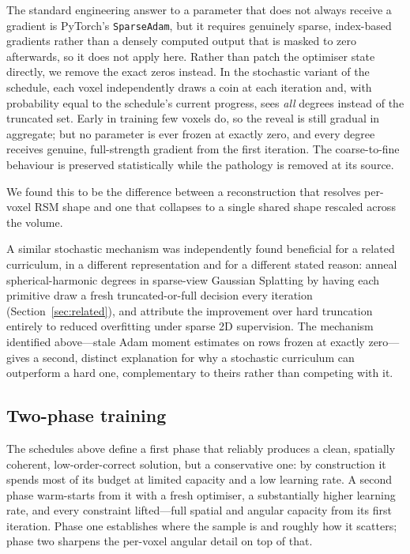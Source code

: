 \documentclass[11pt,a4paper]{article}
\begin{document}
The standard engineering answer to a parameter that does not always receive a gradient is
PyTorch's \texttt{SparseAdam}, but it requires genuinely sparse, index-based gradients
rather than a densely computed output that is masked to zero afterwards, so it does not
apply here. Rather than patch the optimiser state directly, we remove the exact zeros
instead. In the stochastic variant of the schedule, each voxel independently draws a coin
at each iteration and, with probability equal to the schedule's current progress, sees
\emph{all} degrees instead of the truncated set. Early in training few voxels do, so the
reveal is still gradual in aggregate; but no parameter is ever frozen at exactly zero, and
every degree receives genuine, full-strength gradient from the first iteration. The
coarse-to-fine behaviour is preserved statistically while the pathology is removed at its
source.

We found this to be the difference between a reconstruction that resolves per-voxel RSM
shape and one that collapses to a single shared shape rescaled across the volume.

A similar stochastic mechanism was independently found beneficial for a related
curriculum, in a different representation and for a different stated reason:
\citet{Fang2026dropansh} anneal spherical-harmonic degrees in sparse-view Gaussian
Splatting by having each primitive draw a fresh truncated-or-full decision every
iteration (Section~\ref{sec:related}), and attribute the improvement over hard truncation
entirely to reduced overfitting under sparse 2D supervision. The mechanism identified
above---stale Adam moment estimates on rows frozen at exactly zero---gives a second,
distinct explanation for why a stochastic curriculum can outperform a hard one,
complementary to theirs rather than competing with it.

\subsection{Two-phase training}
\label{sec:twophase}

The schedules above define a first phase that reliably produces a clean, spatially
coherent, low-order-correct solution, but a conservative one: by construction it spends
most of its budget at limited capacity and a low learning rate. A second phase warm-starts
from it with a fresh optimiser, a substantially higher learning rate, and every constraint
lifted---full spatial and angular capacity from its first iteration. Phase one establishes
where the sample is and roughly how it scatters; phase two sharpens the per-voxel angular
detail on top of that.
\end{document}
